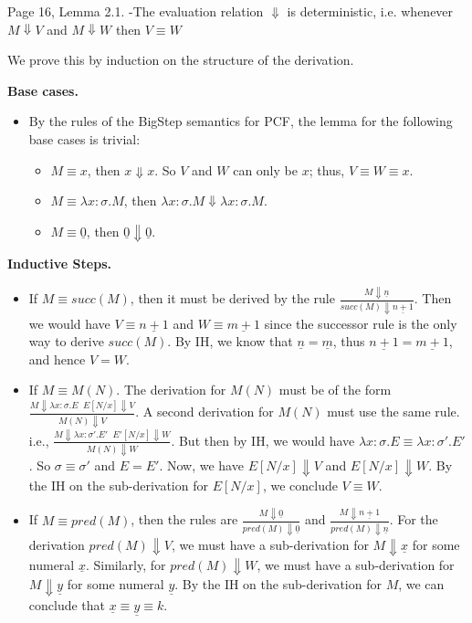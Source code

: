 \begin{problem}{Page 16, Lemma 2.1.}
    -The evaluation relation $\Downarrow$ is deterministic, i.e. whenever $M \Downarrow V$ and $M \Downarrow W$ then $V \equiv W$
\end{problem}

\begin{solution}
        We prove this by induction on the structure of the derivation.

    \textbf{Base cases.}
    \begin{itemize}
        \item By the rules of the BigStep semantics for PCF, the lemma for the following base cases is trivial:
            \begin{itemize}
                \item $M \equiv x$, then $x \Downarrow x$. So $V$ and $W$ can only be $x$; thus, $V \equiv W \equiv x$.
                \item $M \equiv \lambda x:\sigma.M$, then $\lambda x:\sigma.M \Downarrow \lambda x:\sigma.M$.
                \item $M \equiv \underline{0}$, then $\underline{0} \Downarrow \underline{0}$.
            \end{itemize}
    \end{itemize}
    \textbf{Inductive Steps.}
    \begin{itemize}
        \item If $M \equiv succ(M)$, then it must be derived by the rule $\frac{M \Downarrow \underline{n}}{succ(M) \Downarrow \underline{n+1}}$.
              Then we would have $V \equiv \underline{n+1}$ and $W \equiv \underline{m+1}$ since the successor rule is the only way to derive $succ(M)$.
              By IH, we know that $\underline{n} = \underline{m}$, thus $\underline{n+1} = \underline{m+1}$, and hence $V = W$.
        
        \item If $M \equiv M(N)$. The derivation for $M(N)$ must be of the form $\frac{M \Downarrow \lambda x:\sigma.E \;\; E[N/x] \Downarrow V}{M(N) \Downarrow V}$.
              A second derivation for $M(N)$ must use the same rule. i.e., $\frac{M \Downarrow \lambda x:\sigma'.E' \;\; E'[N/x] \Downarrow W}{M(N) \Downarrow W}$.
              But then by IH, we would have $\lambda x:\sigma.E \equiv \lambda x:\sigma'.E'$. So $\sigma \equiv \sigma'$ and $E = E'$. Now, we have $E[N/x] \Downarrow V$ and $E[N/x] \Downarrow W$.
              By the IH on the sub-derivation for $E[N/x]$, we conclude $V \equiv W$.
        \item If $M \equiv pred(M)$, then the rules are $\frac{M \Downarrow \underline{0}}{pred(M) \Downarrow \underline{0}}$ and $\frac{M \Downarrow \underline{n+1}}{pred(M) \Downarrow \underline{n}}$.
              For the derivation $pred(M) \Downarrow V$, we must have a sub-derivation for $M \Downarrow \underline{x}$ for some numeral $\underline{x}$.
              Similarly, for $pred(M) \Downarrow W$, we must have a sub-derivation for $M \Downarrow \underline{y}$ for some numeral $\underline{y}$. 
              By the IH on the sub-derivation for $M$, we can conclude that $\underline{x} \equiv \underline{y} \equiv k$.
              

\end{itemize}
\end{solution}
